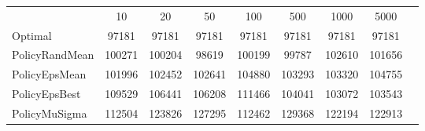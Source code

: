 \begin{tabular}[ht]{|l||c|c|c|c|c|c|c|H}
 & 10 & 20 & 50 & 100 & 500 & 1000 & 5000 & \\  
Optimal &97181 & 97181 & 97181 & 97181 & 97181 & 97181 & 97181 & \\ 
PolicyRandMean &100271 & 100204 & 98619 & 100199 & 99787 & 102610 & 101656 & \\ 
PolicyEpsMean &101996 & 102452 & 102641 & 104880 & 103293 & 103320 & 104755 & \\ 
PolicyEpsBest &109529 & 106441 & 106208 & 111466 & 104041 & 103072 & 103543 & \\ 
PolicyMuSigma &112504 & 123826 & 127295 & 112462 & 129368 & 122194 & 122913 & \\ 
\end{tabular}
